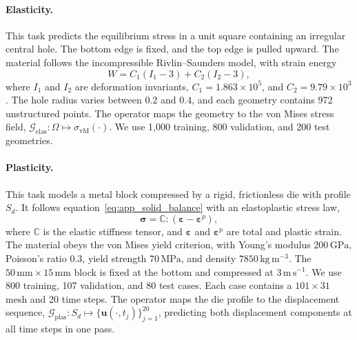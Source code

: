 \documentclass{article}
\def\eqref#1{equation~\ref{#1}}
\begin{document}
\paragraph{Elasticity.}
This task predicts the equilibrium stress in a unit square containing an irregular central hole. The bottom edge is fixed, and the top edge is pulled upward. The material follows the incompressible Rivlin--Saunders model, with strain energy
\begin{equation}
    W=C_1(I_1-3)+C_2(I_2-3),
    \label{eq:app_elasticity}
\end{equation}
where $I_1$ and $I_2$ are deformation invariants, $C_1=1.863\times10^5$, and $C_2=9.79\times10^3$. The hole radius varies between $0.2$ and $0.4$, and each geometry contains 972 unstructured points. The operator maps the geometry to the von Mises stress field, $\mathcal{G}_{\mathrm{elas}}:\Omega\mapsto\sigma_{\mathrm{vM}}(\cdot)$. We use 1,000 training, 800 validation, and 200 test geometries.

\paragraph{Plasticity.}
This task models a metal block compressed by a rigid, frictionless die with profile $S_d$. It follows \eqref{eq:app_solid_balance} with an elastoplastic stress law,
\begin{equation}
    \boldsymbol{\sigma}=\mathbb{C}:(\boldsymbol{\varepsilon}-\boldsymbol{\varepsilon}^{p}),
    \label{eq:app_plasticity}
\end{equation}
where $\mathbb{C}$ is the elastic stiffness tensor, and $\boldsymbol{\varepsilon}$ and $\boldsymbol{\varepsilon}^{p}$ are total and plastic strain. The material obeys the von Mises yield criterion, with Young's modulus $200\,\mathrm{GPa}$, Poisson's ratio $0.3$, yield strength $70\,\mathrm{MPa}$, and density $7850\,\mathrm{kg\,m^{-3}}$. The $50\,\mathrm{mm}\times15\,\mathrm{mm}$ block is fixed at the bottom and compressed at $3\,\mathrm{m\,s^{-1}}$. We use 800 training, 107 validation, and 80 test cases. Each case contains a $101\times31$ mesh and 20 time steps. The operator maps the die profile to the displacement sequence, $\mathcal{G}_{\mathrm{plas}}:S_d\mapsto\{\mathbf{u}(\cdot,t_j)\}_{j=1}^{20}$, predicting both displacement components at all time steps in one pass.
\end{document}
